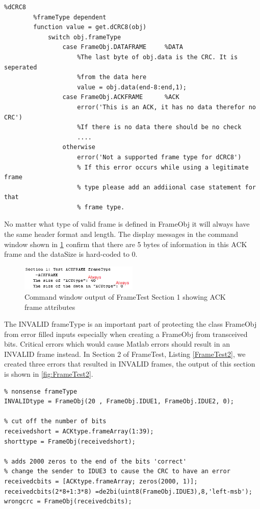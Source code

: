 \begin{lstlisting} 
%dCRC8
        %frameType dependent
        function value = get.dCRC8(obj)
            switch obj.frameType
                case FrameObj.DATAFRAME     %DATA
                    %The last byte of obj.data is the CRC. It is seperated
                    %from the data here
                    value = obj.data(end-8:end,1);
                case FrameObj.ACKFRAME      %ACK
                    error('This is an ACK, it has no data therefor no CRC')
                    %If there is no data there should be no check
					....
				otherwise
                    error('Not a supported frame type for dCRC8')
                    % If this error occurs while using a legitimate frame
                    % type please add an addiional case statement for that
                    % frame type.
\end{lstlisting}

No matter what type of valid frame is defined in FrameObj it will always have the same header format and length. The display messages in the command window shown in \ref{fig:FrameTest1} confirm that there are 5 bytes of information in this ACK frame and the dataSize is hard-coded to 0. 

\begin{figure}[h]
    \includegraphics[width=0.5\textwidth, left]{FrameTest1.PNG}
    \caption{Command window output of FrameTest Section 1 showing ACK frame attributes }
    \label{fig:FrameTest1}
\end{figure}

The INVALID frameType is an important part of protecting the class FrameObj from error filled inputs especially when creating a FrameObj from transceived bits. Critical errors which would cause Matlab errors should result in an INVALID frame instead. In Section 2 of FrameTest, Listing \ref{FrameTest2}, we created three errors that resulted in INVALID frames, the output of this section is shown in \ref{fig:FrameTest2}.

\begin{lstlisting} 
% nonsense frameType
INVALIDtype = FrameObj(20 , FrameObj.IDUE1, FrameObj.IDUE2, 0);

% cut off the number of bits
receivedshort = ACKtype.frameArray(1:39);
shorttype = FrameObj(receivedshort);

% adds 2000 zeros to the end of the bits 'correct'
% change the sender to IDUE3 to cause the CRC to have an error
receivedcbits = [ACKtype.frameArray; zeros(2000, 1)];
receivedcbits(2*8+1:3*8) =de2bi(uint8(FrameObj.IDUE3),8,'left-msb');
wrongcrc = FrameObj(receivedcbits);
\end{lstlisting} 

